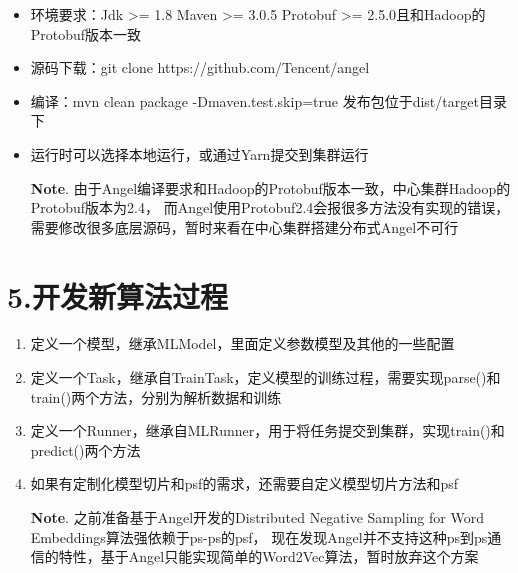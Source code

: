 \documentclass{article}
\begin{document}
\begin{itemize}[noitemsep,topsep=\mdcompacttopsep]%

\item{}环境要求：Jdk \textgreater{}= 1.8 Maven \textgreater{}= 3.0.5 Protobuf \textgreater{}= 2.5.0且和Hadoop的Protobuf版本一致%

\item{}源码下载：git clone https://github.com/Tencent/angel%

\item{}编译：mvn clean package -Dmaven.test.skip=true  发布包位于dist/target目录下%

\item{}运行时可以选择本地运行，或通过Yarn提交到集群运行

\noindent{}\textbf{Note}.
由于Angel编译要求和Hadoop的Protobuf版本一致，中心集群Hadoop的Protobuf版本为2.4，
而Angel使用Protobuf2.4会报很多方法没有实现的错误，需要修改很多底层源码，暂时来看在中心集群搭建分布式Angel不可行%
\end{itemize}%

\section{5.\hspace*{0.5em}开发新算法过程}\label{section}%

\begin{enumerate}[noitemsep,topsep=\mdcompacttopsep]%

\item{}定义一个模型，继承MLModel，里面定义参数模型及其他的一些配置%

\item{}定义一个Task，继承自TrainTask，定义模型的训练过程，需要实现parse()和train()两个方法，分别为解析数据和训练%

\item{}定义一个Runner，继承自MLRunner，用于将任务提交到集群，实现train()和predict()两个方法%

\item{}如果有定制化模型切片和psf的需求，还需要自定义模型切片方法和psf

\noindent{}\textbf{Note}.
之前准备基于Angel开发的Distributed Negative Sampling for Word Embeddings算法强依赖于ps-ps的psf，
现在发现Angel并不支持这种ps到ps通信的特性，基于Angel只能实现简单的Word2Vec算法，暂时放弃这个方案%
\end{enumerate}%
\end{document}
